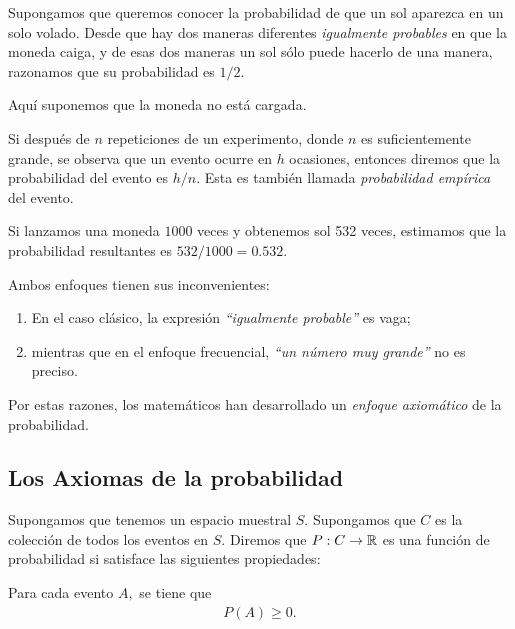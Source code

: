 \begin{ejemplo}
	\label{exmp:2.2.10}
	Supongamos que queremos conocer la probabilidad de que un sol aparezca en un solo volado.  Desde que hay dos maneras diferentes \emph{igualmente probables} en que la moneda caiga,  y de esas dos maneras un sol sólo puede hacerlo de una manera, razonamos que su probabilidad es $1/2.$
	
	
	\begin{observacion}
		Aquí suponemos que la moneda no está cargada.
	\end{observacion}
	
\end{ejemplo}


Si después de $n$ repeticiones de un experimento, donde $n$ es suficientemente grande, se observa que un evento ocurre en $h$ ocasiones, entonces diremos que la probabilidad del evento es $h/n.$  Esta es también llamada \emph{probabilidad empírica} del evento.


\begin{ejemplo}
	\label{exmp:2.2.11}
	Si lanzamos una moneda $1000$ veces y obtenemos sol 532 veces, estimamos que la probabilidad resultantes es $532/1000=0.532$.
\end{ejemplo}



\begin{observacion}
	Ambos enfoques tienen sus inconvenientes:
	\begin{enumerate}
		\item En el caso clásico, la expresión \emph{``igualmente probable''} es vaga; 
		\item mientras que en el enfoque frecuencial, \emph{``un número muy grande''} no es preciso. 
	\end{enumerate}
	Por estas razones, los matemáticos han desarrollado un \emph{enfoque axiomático} de la probabilidad.
\end{observacion}


\subsection{Los Axiomas de la probabilidad}

Supongamos que tenemos un espacio muestral $S.$ Supongamos que $C$ es la colección de todos los eventos en $S.$ Diremos que $P:C \to \mathbb{R}$ es una función de probabilidad si satisface las siguientes propiedades:

\begin{axioma}
	Para cada evento $A,$ se tiene que
	\begin{align}
		\label{eq:2.2.1}
		P(A)\geq 0.
	\end{align}
	
\end{axioma}



